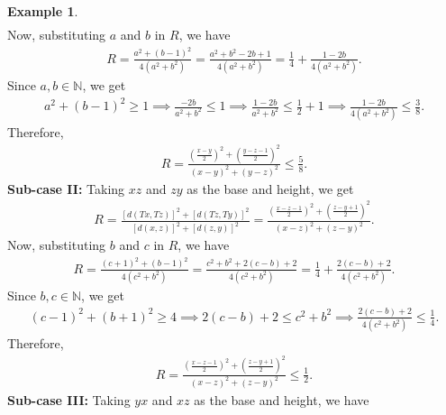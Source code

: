 \documentclass[11pt,reqno,a4paper]{amsart}
\theoremstyle{plain}
\theoremstyle{definition}
\newtheorem{example}[theorem]{Example}
\theoremstyle{remark}
\numberwithin{equation}{section}
\begin{document}
\begin{example}
\begin{align*}
\end{align*}
Now, substituting $a$ and $b$ in $R$, we have
\begin{align*}
    R= \frac{a^2 + (b-1)^2}{4(a^2 + b^2)}
     =\frac{a^2 + b^2 - 2b + 1}{4(a^2 + b^2)}
     = \frac{1}{4} + \frac{1 - 2b}{4(a^2 + b^2)}.
\end{align*}
Since $a,b \in \mathbb{N}$, we get
\begin{align*}
    a^2 + (b-1)^2 \ge 1
    \implies \frac{-2b}{a^2 + b^2} \le 1
    \implies \frac{1 - 2b}{a^2 + b^2} \le \frac{1}{2} + 1
    \implies \frac{1 - 2b}{4(a^2 + b^2)} \le \frac{3}{8}.
\end{align*}
Therefore, 
\begin{align}\label{2821}
   R=\frac{(\frac{x-y}{2})^2 +(\frac{y-z-1}{2})^2}{(x-y)^2 +(y-z)^2} \le \frac{5}{8}. 
\end{align}
\textbf{Sub-case II:} Taking $xz$ and $zy$ as the base and height, we get
\begin{align*}
    R=\frac{[d(Tx,Tz)]^2 +[d(Tz,Ty)]^2}{[d(x,z)]^2 +[d(z,y)]^2}
     =\frac{(\frac{x-z-1}{2})^2 +(\frac{z-y+1}{2})^2}{(x-z)^2 +(z-y)^2}.
\end{align*}
Now, substituting $b$ and $c$ in $R$, we have
\begin{align*}
    R 
     = \frac{(c+1)^2 + (b-1)^2}{4(c^2 + b^2)}
     =\frac{c^2 + b^2 + 2(c - b) + 2}{4(c^2 + b^2)}
     = \frac{1}{4} + \frac{2(c - b) + 2}{4(c^2 + b^2)}.
\end{align*}
Since $b,c \in \mathbb{N}$, we get
\begin{align*}
    (c-1)^2 + (b+1)^2 \ge 4
    \implies 2(c - b) + 2 \le c^2 + b^2
    \implies \frac{2(c - b) + 2}{4(c^2 + b^2)} \le \frac{1}{4}.
\end{align*}
Therefore, 
\begin{align}\label{2822}
   R= \frac{(\frac{x-z-1}{2})^2 +(\frac{z-y+1}{2})^2}{(x-z)^2 +(z-y)^2} \le \frac{1}{2}. 
\end{align}
\textbf{Sub-case III:} Taking $yx$ and $xz$ as the base and height, we have
\begin{align*}

\end{align*}
\end{example}
\end{document}
